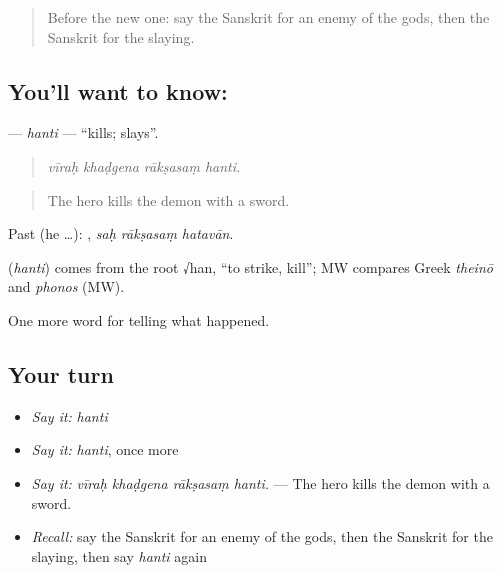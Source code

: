 \begin{quote}
Before the new one: say the Sanskrit for an enemy of the gods, then the Sanskrit for the slaying.
\end{quote}

\subsection*{You'll want to know: }
\textbf{} — \emph{hanti} — \textquotedblleft{}kills; slays\textquotedblright{}.

\begin{quote}
   
\end{quote}

\begin{quote}
\emph{vīraḥ khaḍgena rākṣasaṃ hanti.}
\end{quote}

\begin{quote}
The hero kills the demon with a sword.
\end{quote}

Past (he …):   , \emph{saḥ rākṣasaṃ hatavān}.

\begin{cousinweb}
\textbf{} (\emph{hanti}) comes from the root √han, \textquotedblleft{}to strike, kill\textquotedblright{}; MW compares Greek \emph{theinō} and \emph{phonos} (MW).
\end{cousinweb}

\begin{grammarlens}[title={What you've built}]
One more word for telling what happened.
\end{grammarlens}

\subsection*{Your turn}
\begin{itemize}
\raggedright
  \item \emph{Say it:} \emph{hanti}
  \item \emph{Say it:} \emph{hanti}, once more
  \item \emph{Say it:} \emph{vīraḥ khaḍgena rākṣasaṃ hanti.} — The hero kills the demon with a sword.
  \item \emph{Recall:} say the Sanskrit for an enemy of the gods, then the Sanskrit for the slaying, then say \emph{hanti} again
\end{itemize}

